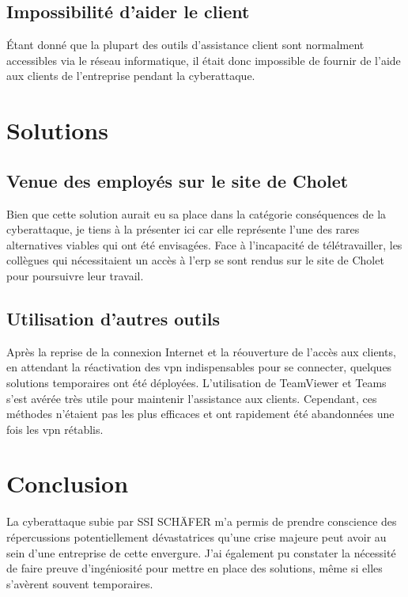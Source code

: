 \documentclass[a4paper, 12pt, french]{article}
\begin{document}
				\subsection{Impossibilité d'aider le client}
					Étant donné que la plupart des outils d'assistance client sont normalment accessibles via le réseau informatique, il était donc impossible de fournir de l'aide aux clients de l'entreprise pendant la cyberattaque.
				
			\section{Solutions}
				\subsection{Venue des employés sur le site de Cholet}
					Bien que cette solution aurait eu sa place dans la catégorie conséquences de la cyberattaque, je tiens à la présenter ici car elle représente l'une des rares alternatives viables qui ont été envisagées. Face à l'incapacité de télétravailler, les collègues qui nécessitaient un accès à l'\acrshort{erp} se sont rendus sur le site de Cholet pour poursuivre leur travail.

				\subsection{Utilisation d'autres outils}
					Après la reprise de la connexion Internet et la réouverture de l'accès aux clients, en attendant la réactivation des \acrshort{vpn} indispensables pour se connecter, quelques solutions temporaires ont été déployées. L'utilisation de TeamViewer et Teams s'est avérée très utile pour maintenir l'assistance aux clients. Cependant, ces méthodes n'étaient pas les plus efficaces et ont rapidement été abandonnées une fois les \acrshort{vpn} rétablis.

			\section{Conclusion}
				La cyberattaque subie par SSI SCHÄFER m'a permis de prendre conscience des répercussions potentiellement dévastatrices qu'une crise majeure peut avoir au sein d'une entreprise de cette envergure. J'ai également pu constater la nécessité de faire preuve d'ingéniosité pour mettre en place des solutions, même si elles s'avèrent souvent temporaires.
			
		\newpage
\end{document}
